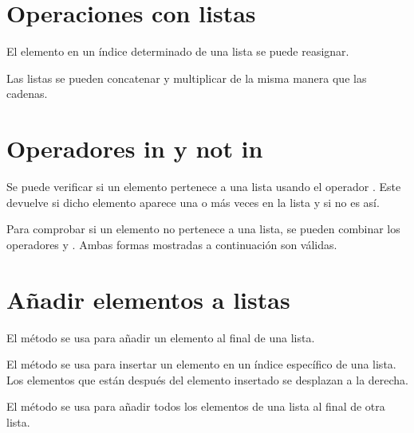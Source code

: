 
\section{Operaciones con listas}

El elemento en un índice determinado de una lista se puede reasignar.


Las listas se pueden concatenar y multiplicar de la misma manera que las cadenas.


\section{Operadores in y not in}

Se puede verificar si un elemento pertenece a una lista usando el operador . Este devuelve  si dicho elemento aparece una o más veces en la lista y  si no es así.


Para comprobar si un elemento no pertenece a una lista, se pueden combinar los operadores  y . Ambas formas mostradas a continuación son válidas.


\section{Añadir elementos a listas}

El método  se usa para añadir un elemento al final de una lista.
  

El método  se usa para insertar un elemento en un índice específico de una lista. Los elementos que están después del elemento insertado se desplazan a la derecha.


El método  se usa para añadir todos los elementos de una lista al final de otra lista.
  
